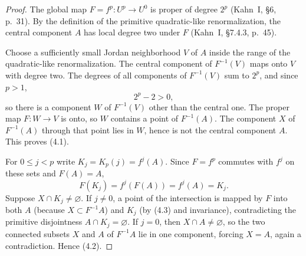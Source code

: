 \begin{proof}
The global map \(F=f^p\colon U^p\to U^0\) is proper of degree \(2^p\) (Kahn~I, \S6, p.~31).  By the definition of the primitive quadratic-like renormalization, the central component \(A\) has local degree two under \(F\) (Kahn~I, \S7.4.3, p.~45).

Choose a sufficiently small Jordan neighborhood \(V\) of \(A\) inside the range of the quadratic-like renormalization.  The central component of \(F^{-1}(V)\) maps onto \(V\) with degree two.  The degrees of all components of \(F^{-1}(V)\) sum to \(2^p\), and since \(p>1\),
\[
 2^p-2>0,
\]
so there is a component \(W\) of \(F^{-1}(V)\) other than the central one.  The proper map \(F\colon W\to V\) is onto, so \(W\) contains a point of \(F^{-1}(A)\).  The component \(X\) of \(F^{-1}(A)\) through that point lies in \(W\), hence is not the central component \(A\).  This proves (4.1).

For \(0\le j<p\) write \(K_j=K_p(j)=f^j(A)\).  Since \(F=f^p\) commutes with \(f^j\) on these sets and \(F(A)=A\),
\[
 F(K_j)=f^j(F(A))=f^j(A)=K_j.                       \tag{4.3}
\]
Suppose \(X\cap K_j\ne\varnothing\).  If \(j\ne0\), a point of the intersection is mapped by \(F\) into both \(A\) (because \(X\subset F^{-1}A\)) and \(K_j\) (by (4.3) and invariance), contradicting the primitive disjointness \(A\cap K_j=\varnothing\).  If \(j=0\), then \(X\cap A\ne\varnothing\), so the two connected subsets \(X\) and \(A\) of \(F^{-1}A\) lie in one component, forcing \(X=A\), again a contradiction.  Hence (4.2).
\end{proof}
